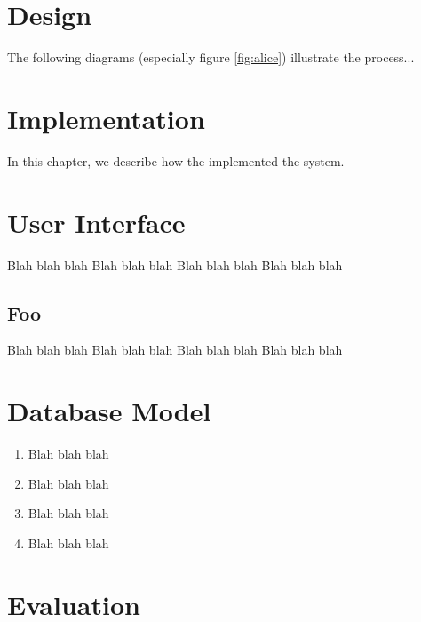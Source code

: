 \documentclass{l3proj}
\begin{document}
\section{Design}
\label{design}

The following diagrams (especially figure \ref{fig:alice}) illustrate the
process...

\section{Implementation}
\label{impl}

In this chapter, we describe how the implemented the system.

\section{User Interface}

Blah blah blah
Blah blah blah
Blah blah blah
Blah blah blah

\subsection{Foo}

Blah blah blah
Blah blah blah
Blah blah blah
Blah blah blah

\section{Database Model}

\begin{enumerate}
\item Blah blah blah
\item Blah blah blah
\item Blah blah blah
\item Blah blah blah
\end{enumerate}



\section{Evaluation}
\end{document}
